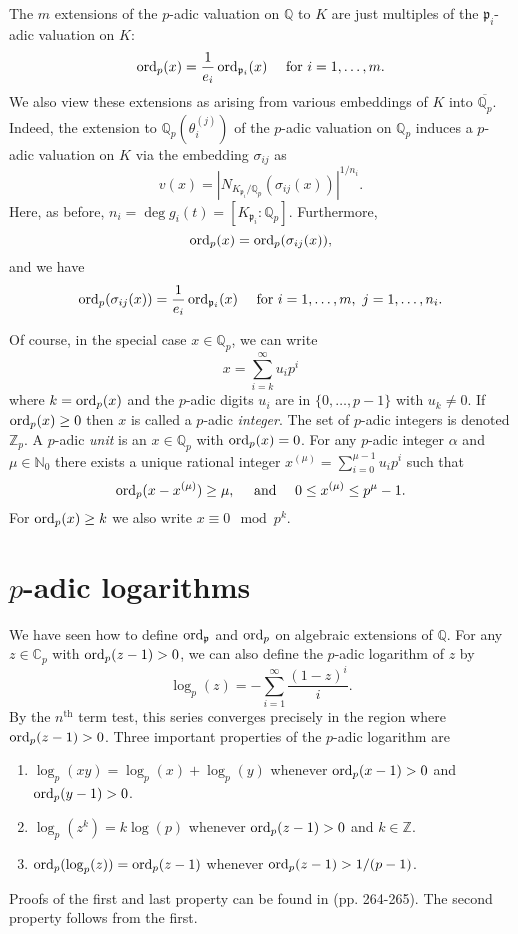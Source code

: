 The $m$ extensions of the $p$-adic valuation on $\mathbb{Q}$ to $K$ are just multiples of the $\mathfrak{p}_i$-adic valuation on $K$:
\[\operatorname{ord}_p(x) = \frac{1}{e_i}\operatorname{ord}_{\mathfrak{p}_i}(x) \quad \text{ for } i = 1, \dots, m.\]
We also view these extensions as arising from various embeddings of $K$ into $\overline{\mathbb{Q}_p}$. Indeed, the extension to $\mathbb{Q}_p(\theta_i^{(j)})$ of the $p$-adic valuation on $\mathbb{Q}_p$ induces a $p$-adic valuation on $K$ via the embedding $\sigma_{ij}$ as 
\[v(x) = |N_{K_{\mathfrak{p}_i}/\mathbb{Q}_p}(\sigma_{ij}(x))|^{1/n_i}.\]
Here, as before, $n_i = \deg g_i(t) = [K_{\mathfrak{p}_i} : \mathbb{Q}_p]$. Furthermore, 
\[\operatorname{ord}_p(x) = \operatorname{ord}_p(\sigma_{ij}(x)),\]
and we have
\[\operatorname{ord}_p(\sigma_{ij}(x)) =  \frac{1}{e_i}\operatorname{ord}_{\mathfrak{p}_i}(x) \quad \text{ for } i = 1, \dots, m,\ j = 1, \dots, n_i.\]

Of course, in the special case $x \in \mathbb{Q}_p$, we can write
\[x = \sum_{i=k}^{\infty} u_ip^i\]
where $k = \operatorname{ord}_p(x)$ and the $p$-adic digits $u_i$ are in $\{0, \dots, p-1\}$ with $u_k \neq 0$. If $\operatorname{ord}_p(x) \geq 0$ then $x$ is called a $p$-adic \textit{integer}. The set of $p$-adic integers is denoted $\mathbb{Z}_p$. A $p$-adic \textit{unit} is an $x \in \mathbb{Q}_p$ with $\operatorname{ord}_p(x) = 0$. For any $p$-adic integer $\alpha$ and $\mu \in \mathbb{N}_0$ there exists a unique rational integer $x^{(\mu)} = \sum_{i=0}^{\mu-1}u_ip^i$ such that 
\[\operatorname{ord}_p(x-x^{(\mu)}) \geq \mu, \quad \text{ and } \quad 0 \leq x^{(\mu)} \leq p^{\mu} - 1.\]
For $\operatorname{ord}_p(x) \geq k$ we also write $x \equiv 0 \mod{p^k}$.


\section{$p$-adic logarithms}
\label{sec:pAdicLogarithms}

We have seen how to define $\operatorname{ord}_{\mathfrak{p}}$ and $\operatorname{ord}_p$ on algebraic extensions of $\mathbb{Q}$. For any $z \in \mathbb{C}_p$ with $\operatorname{ord}_p(z-1) > 0$, we can also define the $p$-adic logarithm of $z$ by
\[\log_p(z) = -\sum_{i=1}^{\infty} \frac{(1-z)^i}{i}.\]
By the $n^{\text{th}}$ term test, this series converges precisely in the region where ${\operatorname{ord}_p(z-1) > 0}$. Three important properties of the $p$-adic logarithm are
\begin{enumerate}
\item $\log_p(xy) = \log_p(x) + \log_p(y)$ whenever $\operatorname{ord}_p(x-1) > 0$ and $\operatorname{ord}_p(y-1) > 0$.
\item $\log_p(z^k) = k \log(p)$ whenever $\operatorname{ord}_p(z-1) > 0$ and $k \in \mathbb{Z}$. 
\item $\operatorname{ord}_p(\log_p(z)) = \operatorname{ord}_p(z-1)$ whenever $\operatorname{ord}_p(z-1) > 1/(p-1)$.
\end{enumerate}
Proofs of the first and last property can be found in \cite{Has2} (pp. 264-265). The second property follows from the first.


